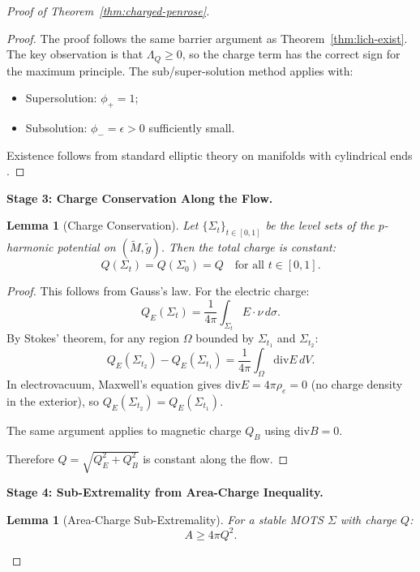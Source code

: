 \documentclass[12pt]{article}
\theoremstyle{plain}
\newtheorem{lemma}[theorem]{Lemma}
\theoremstyle{definition}
\theoremstyle{remark}
\newcommand{\Div}{\mathrm{div}}
\begin{document}
\begin{proof}[Proof of Theorem~\ref{thm:charged-penrose}]
\begin{proof}
The proof follows the same barrier argument as Theorem~\ref{thm:lich-exist}. The key observation is that $\Lambda_Q \geq 0$, so the charge term has the correct sign for the maximum principle. The sub/super-solution method applies with:
\begin{itemize}
    \item Supersolution: $\phi_+ = 1$;
    \item Subsolution: $\phi_- = \epsilon > 0$ sufficiently small.
\end{itemize}
Existence follows from standard elliptic theory on manifolds with cylindrical ends \cite{lockhartmccowen1985}.
\end{proof}

\textbf{Stage 3: Charge Conservation Along the Flow.}

\begin{lemma}[Charge Conservation]\label{lem:charge-conserve}
Let $\{\Sigma_t\}_{t \in [0,1]}$ be the level sets of the $p$-harmonic potential on $(\tilde{M}, \tilde{g})$. Then the total charge is constant:
\begin{equation}
    Q(\Sigma_t) = Q(\Sigma_0) = Q \quad \text{for all } t \in [0,1].
\end{equation}
\end{lemma}

\begin{proof}
This follows from Gauss's law. For the electric charge:
\[
Q_E(\Sigma_t) = \frac{1}{4\pi}\int_{\Sigma_t} E \cdot \nu \, d\sigma.
\]
By Stokes' theorem, for any region $\Omega$ bounded by $\Sigma_{t_1}$ and $\Sigma_{t_2}$:
\[
Q_E(\Sigma_{t_2}) - Q_E(\Sigma_{t_1}) = \frac{1}{4\pi}\int_\Omega \Div E \, dV.
\]
In electrovacuum, Maxwell's equation gives $\Div E = 4\pi \rho_e = 0$ (no charge density in the exterior), so $Q_E(\Sigma_{t_2}) = Q_E(\Sigma_{t_1})$.

The same argument applies to magnetic charge $Q_B$ using $\Div B = 0$.

Therefore $Q = \sqrt{Q_E^2 + Q_B^2}$ is constant along the flow.
\end{proof}

\textbf{Stage 4: Sub-Extremality from Area-Charge Inequality.}

\begin{lemma}[Area-Charge Sub-Extremality]\label{lem:area-charge-subext}
For a stable MOTS $\Sigma$ with charge $Q$:
\begin{equation}
    A \geq 4\pi Q^2.
\end{equation}
\end{lemma}


\end{proof}
\end{document}
